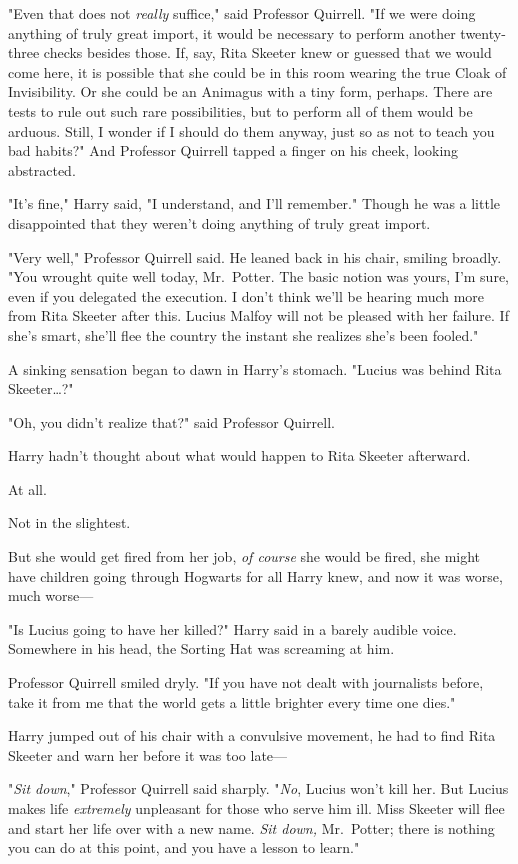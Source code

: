 "Even that does not \emph{really} suffice," said Professor Quirrell. "If we 
were doing anything of truly great import, it would be necessary to perform 
another twenty-three checks besides those. If, say, Rita Skeeter knew or 
guessed that we would come here, it is possible that she could be in this room 
wearing the true Cloak of Invisibility. Or she could be an Animagus with a tiny 
form, perhaps. There are tests to rule out such rare possibilities, but to 
perform all of them would be arduous. Still, I wonder if I should do them 
anyway, just so as not to teach you bad habits?" And Professor Quirrell tapped 
a finger on his cheek, looking abstracted.

"It's fine," Harry said, "I understand, and I'll remember." Though he was a 
little disappointed that they weren't doing anything of truly great import.

"Very well," Professor Quirrell said. He leaned back in his chair, smiling 
broadly. "You wrought quite well today, Mr.~Potter. The basic notion was yours, 
I'm sure, even if you delegated the execution. I don't think we'll be hearing 
much more from Rita Skeeter after this. Lucius Malfoy will not be pleased with 
her failure. If she's smart, she'll flee the country the instant she realizes 
she's been fooled."

A sinking sensation began to dawn in Harry's stomach. "Lucius was behind Rita 
Skeeter{\ldots}?"

"Oh, you didn't realize that?" said Professor Quirrell.

Harry hadn't thought about what would happen to Rita Skeeter afterward.

At all.

Not in the slightest.

But she would get fired from her job, \emph{of course} she would be fired, she 
might have children going through Hogwarts for all Harry knew, and now it was 
worse, much worse---

"Is Lucius going to have her killed?" Harry said in a barely audible voice. 
Somewhere in his head, the Sorting Hat was screaming at him.

Professor Quirrell smiled dryly. "If you have not dealt with journalists 
before, take it from me that the world gets a little brighter every time one 
dies."

Harry jumped out of his chair with a convulsive movement, he had to find Rita 
Skeeter and warn her before it was too late---

"\emph{Sit down}," Professor Quirrell said sharply. "\emph{No}, Lucius won't 
kill her. But Lucius makes life \emph{extremely} unpleasant for those who serve 
him ill. Miss Skeeter will flee and start her life over with a new name. 
\emph{Sit down,} Mr.~Potter; there is nothing you can do at this point, and you 
have a lesson to learn."

